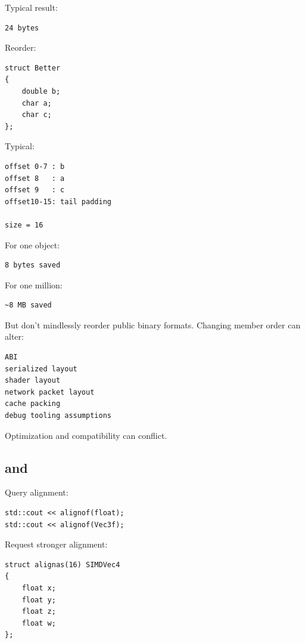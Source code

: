 Typical result:

\begin{verbatim}
24 bytes
\end{verbatim}

Reorder:

\begin{verbatim}
struct Better
{
    double b;
    char a;
    char c;
};
\end{verbatim}

Typical:

\begin{verbatim}
offset 0-7 : b
offset 8   : a
offset 9   : c
offset10-15: tail padding

size = 16
\end{verbatim}

For one object:

\begin{verbatim}
8 bytes saved
\end{verbatim}

For one million:

\begin{verbatim}
~8 MB saved
\end{verbatim}

But don't mindlessly reorder public binary formats. Changing member order can alter:

\begin{verbatim}
ABI
serialized layout
shader layout
network packet layout
cache packing
debug tooling assumptions
\end{verbatim}

Optimization and compatibility can conflict.

\subsection{\texorpdfstring{ and }{alignof and alignas}}\label{01-foundations-i-ch003-alignof-and-alignas}

\hypertarget{01-foundations-i-ch003-alignof-and-alignas}{}

Query alignment:

\begin{verbatim}
std::cout << alignof(float);
std::cout << alignof(Vec3f);
\end{verbatim}

Request stronger alignment:

\begin{verbatim}
struct alignas(16) SIMDVec4
{
    float x;
    float y;
    float z;
    float w;
};
\end{verbatim}

